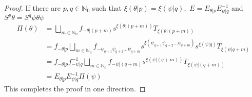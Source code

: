 \documentclass{amsproc}
\theoremstyle{plain}
\theoremstyle{definition}
\numberwithin{equation}{section}
\begin{document}
\begin{proof}
If there are $p,q\in\mathbb{N}_{0}$ such that $\xi(\theta|p)=\xi(\psi|q),$ $%
E=E_{\theta|p}E_{\psi|q}^{-1}$ and $S^{p}\theta=S^{q}\psi\theta\psi$%
\begin{align*}
\Pi(\theta) & =\bigsqcup\limits_{m\in\mathbb{N}_{0}}f_{-\theta|\left(
p+m\right) }s^{\xi\left( \theta|\left( p+m\right) \right) }T_{\xi\left(
\theta|\left( p+m\right) \right) } \\
& =f_{-\theta|p}\bigsqcup\limits_{m\in\mathbb{N}_{0}}f_{-\psi_{q+1}\psi
_{q+2}...\psi_{q+m}}s^{\xi\left( \psi_{q+1}\psi_{q+2}...\psi_{q+m}\right)
}s^{\xi(\psi|q)}T_{\xi(\psi|q+m)} \\
& =f_{-\theta|p}f_{-\psi|q}^{-1}\bigsqcup\limits_{m\in\mathbb{N}%
_{0}}f_{-\psi|\left( q+m\right) }s^{\xi\left( \psi|\left( q+m\right) \right)
}T_{\xi\left( \psi|\left( q+m\right) \right) } \\
& =E_{\theta|p}E_{\psi|q}^{-1}\Pi(\psi)
\end{align*}
This completes the proof in one direction.


\end{proof}
\end{document}
